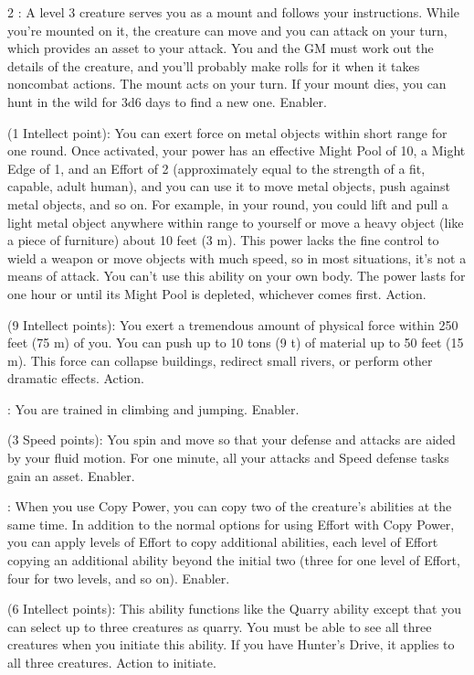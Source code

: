 \begin{multicols}{2}
: A level 3 creature serves you as a mount and follows your instructions. While you’re mounted on it, the creature can move and you can attack on your turn, which provides an asset to your attack. You and the GM must work out the details of the creature, and you’ll probably make rolls for it when it takes noncombat actions. The mount acts on your turn. If your mount dies, you can hunt in the wild for 3d6 days to find a new one. Enabler. 
 
 (1 Intellect point): You can exert force on metal objects within short range for one round. Once activated, your power has an effective Might Pool of 10, a Might Edge of 1, and an Effort of 2 (approximately equal to the strength of a fit, capable, adult human), and you can use it to move metal objects, push against metal objects, and so on. For example, in your round, you could lift and pull a light metal object anywhere within range to yourself or move a heavy object (like a piece of furniture) about 10 feet (3 m). This power lacks the fine control to wield a weapon or move objects with much speed, so in most situations, it’s not a means of attack. You can’t use this ability on your own body. The power lasts for one hour or until its Might Pool is depleted, whichever comes first. Action. 
 
 (9 Intellect points): You exert a tremendous amount of physical force within 250 feet (75 m) of you. You can push up to 10 tons (9 t) of material up to 50 feet (15 m). This force can collapse buildings, redirect small rivers, or perform other dramatic effects. Action. 
 
: You are trained in climbing and jumping. Enabler.
 
 (3 Speed points): You spin and move so that your defense and attacks are aided by your fluid motion. For one minute, all your attacks and Speed defense tasks gain an asset. Enabler. 
 
: When you use Copy Power, you can copy two of the creature’s abilities at the same time. In addition to the normal options for using Effort with Copy Power, you can apply levels of Effort to copy additional abilities, each level of Effort copying an additional ability beyond the initial two (three for one level of Effort, four for two levels, and so on). Enabler.

 (6 Intellect points): This ability functions like the Quarry ability except that you can select up to three creatures as quarry. You must be able to see all three creatures when you initiate this ability. If you have Hunter’s Drive, it applies to all three creatures. Action to initiate. 
 

\end{multicols}
